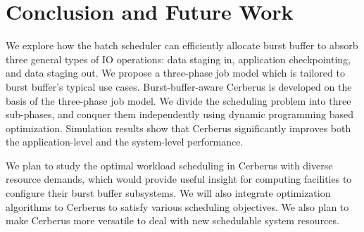 \section{Conclusion and Future Work}
\label{Sec:Conclusion}

We explore how the batch scheduler can efficiently allocate burst buffer to absorb three general types of IO operations:
data staging in, application checkpointing, and data staging out.
We propose a three-phase job model which is tailored to burst buffer's typical use cases.
Burst-buffer-aware Cerberus is developed on the basis of the three-phase job model.
We divide the scheduling problem into three sub-phases, and conquer them independently using dynamic programming based optimization.
Simulation results show that Cerberus significantly improves both the application-level and the system-level performance.

We plan to study the optimal workload scheduling in Cerberus with diverse resource demands,
which would provide useful insight for computing facilities to configure their burst buffer subsystems.
We will also integrate optimization algorithms to Cerberus to satisfy various scheduling objectives.
We also plan to make Cerberus more versatile to deal with new schedulable system resources.

